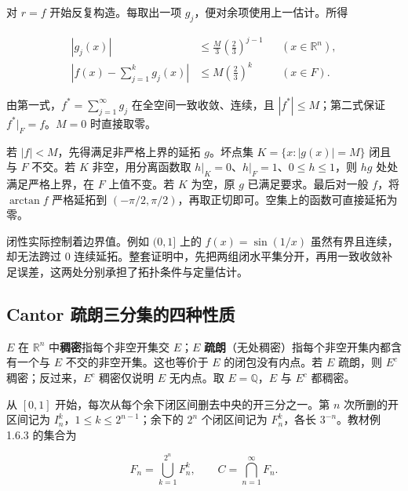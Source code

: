 \documentclass[11pt,a4paper]{article}
\begin{document}
对 \(r=f\) 开始反复构造。每取出一项 \(g_j\)，便对余项使用上一估计。所得

\[
\begin{aligned}
|g_j(x)|&\leq\frac M3\left(\frac23\right)^{j-1}
&& (x\in\mathbb R^n),\\
\left|f(x)-\sum_{j=1}^k g_j(x)\right|
&\leq M\left(\frac23\right)^k && (x\in F).
\end{aligned}
\]

由第一式，\(f^*=\sum_{j=1}^{\infty}g_j\) 在全空间一致收敛、连续，且 \(|f^*|\leq M\)；第二式保证 \(f^*|_F=f\)。\(M=0\) 时直接取零。

若 \(|f|<M\)，先得满足非严格上界的延拓 \(g\)。坏点集 \(K=\{x:|g(x)|=M\}\) 闭且与 \(F\) 不交。若 \(K\) 非空，用分离函数取 \(h|_K=0\)、\(h|_F=1\)、\(0\leq h\leq1\)，则 \(hg\) 处处满足严格上界，在 \(F\) 上值不变。若 \(K\) 为空，原 \(g\) 已满足要求。最后对一般 \(f\)，将 \(\arctan f\) 严格延拓到 \((-\pi/2,\pi/2)\)，再取正切即可。空集上的函数可直接延拓为零。

闭性实际控制着边界值。例如 \((0,1]\) 上的 \(f(x)=\sin(1/x)\) 虽然有界且连续，却无法跨过 \(0\) 连续延拓。整套证明中，先把两组闭水平集分开，再用一致收敛补足误差，这两处分别承担了拓扑条件与定量估计。

\subsection{Cantor 疏朗三分集的四种性质}

\(E\) 在 \(\mathbb R^n\) 中\textbf{稠密}指每个非空开集交 \(E\)；\(E\) \textbf{疏朗}（无处稠密）指每个非空开集内都含有一个与 \(E\) 不交的非空开集。这也等价于 \(E\) 的闭包没有内点。若 \(E\) 疏朗，则 \(E^c\) 稠密；反过来，\(E^c\) 稠密仅说明 \(E\) 无内点。取 \(E=\mathbb Q\)，\(E\) 与 \(E^c\) 都稠密。

从 \([0,1]\) 开始，每次从每个余下闭区间删去中央的开三分之一。第 \(n\) 次所删的开区间记为 \(I_n^k\)，\(1\leq k\leq2^{n-1}\)；余下的 \(2^n\) 个闭区间记为 \(F_n^k\)，各长 \(3^{-n}\)。教材例 1.6.3 的集合为

\[
F_n=\bigcup_{k=1}^{2^n}F_n^k,\qquad C=\bigcap_{n=1}^{\infty}F_n.
\]
\end{document}
